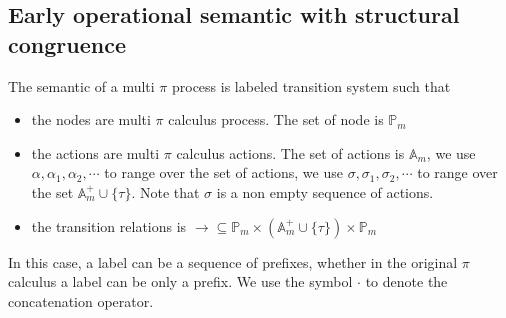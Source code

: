 \subsection{Early operational semantic with structural congruence}

The semantic of a multi $\pi$ process is labeled transition system such that
\begin{itemize}
  \item 
    the nodes are multi $\pi$ calculus process. The set of node is $\mathbb{P}_{m}$
  \item
    the actions are multi $\pi$ calculus actions. The set of actions is $\mathbb{A}_{m}$, we use $\alpha, \alpha_{1}, \alpha_{2},\cdots $ to range over the set of actions, we use $\sigma, \sigma_{1}, \sigma_{2}, \cdots $ to range over the set $\mathbb{A}_{m}^{+} \cup \{\tau\}$. Note that $\sigma$ is a non empty sequence of actions.
  \item
    the transition relations is $\rightarrow\subseteq \mathbb{P}_{m}\times (\mathbb{A}_{m}^{+} \cup \{\tau\})\times \mathbb{P}_{m}$
\end{itemize}

In this case, a label can be a sequence of prefixes, whether in the original $\pi$ calculus a label can be only a prefix. We use the symbol $\cdot$ to denote the concatenation operator.

